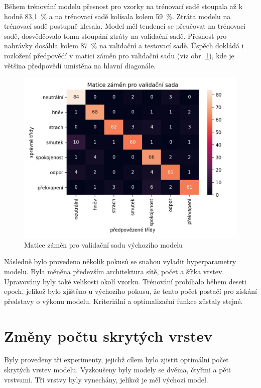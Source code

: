 \documentclass[FM,BP]{tulthesis}
\newcommand{\note}[1]{\todo[color=blue!40]{#1}}
\begin{document}
Během trénování modelu přesnost pro vzorky na trénovací sadě stoupala až k hodně \mbox{83,1 \%} a na trénovací sadě kolísala kolem \mbox{59 \%}. \note{hodně?} Ztráta modelu na trénovací sadě postupně klesala. Model měl tendenci se přeučovat na trénovací sadě, dosvědčovalo tomu stoupání ztráty na validační sadě. Přesnost pro nahrávky dosáhla kolem \mbox{87 \%} na validační a testovací sadě. Úspěch dokládá i rozložení předpovědí v matici záměn pro validační sadu (viz obr. \mbox{\ref{fig:conf_matrix-val-baseline}}), kde je většina předpovědí umístěna na hlavní diagonále.

\begin{figure}[!htbp]
\centerline{\includegraphics[scale=.5]{baseline-conf_matrix-val.png}}
\caption{Matice záměn pro validační sadu výchozího modelu}
\label{fig:conf_matrix-val-baseline}
\end{figure}
\FloatBarrier

Následně bylo provedeno několik pokusů se snahou vyladit hyperparametry modelu. Byla měněna především architektura sítě, počet a šířka vrstev. Upravovány byly také velikosti okolí vzorku. Trénování probíhalo během deseti epoch, jelikož bylo zjištěno u výchozího pokusu, že tento počet postačí pro získání představy o výkonu modelu. Kriteriální a optimalizační funkce zůstaly stejné.

\section{Změny počtu skrytých vrstev} %
Byly provedeny tři experimenty, jejichž cílem bylo zjistit optimální počet skrytých vrstev modelu. Vyzkoušeny byly modely se dvěma, čtyřmi a pěti vrstvami. Tři vrstvy byly vynechány, jelikož je měl výchozí model.
\end{document}
